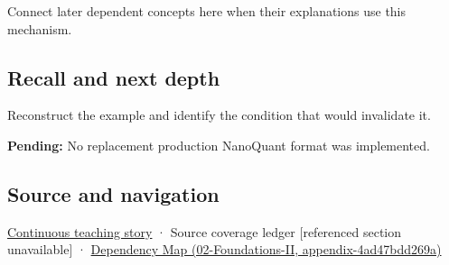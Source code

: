 Connect later dependent concepts here when their explanations use this mechanism.

\subsection{Recall and next depth}\label{appendix-590bbb2424c1-recall-and-next-depth}

Reconstruct the example and identify the condition that would invalidate it.

\textbf{Pending:} No replacement production NanoQuant format was implemented.

\subsection{Source and navigation}\label{appendix-590bbb2424c1-source-and-navigation}

\hyperref[01-foundations-i-ch002-bytes-become-a-durable-agreement]{Continuous teaching story} · {Source coverage ledger {[}referenced section unavailable{]}} · \href{../02-Foundations-II/main.pdf\#nameddest=appendix-4ad47bdd269a}{Dependency Map (02-Foundations-II, appendix-4ad47bdd269a)}
